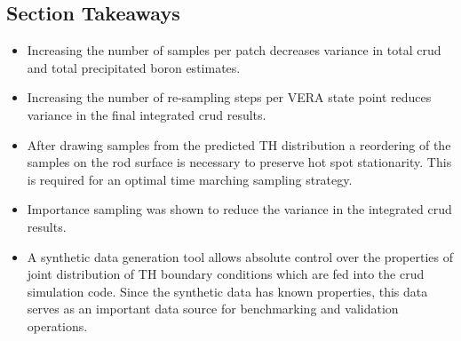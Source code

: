 \subsection{Section Takeaways}
\begin{itemize}
        \item Increasing the number of samples per patch decreases variance in total crud and total precipitated boron estimates.
        \item Increasing the number of re-sampling steps per VERA state point reduces variance in the final integrated crud results.
        \item After drawing samples from the predicted TH distribution a reordering of the samples on the rod surface is necessary to preserve hot spot stationarity.  This is required for an optimal time marching sampling strategy.
        \item Importance sampling was shown to reduce the variance in the integrated crud results.
        \item A synthetic data generation tool allows absolute control over the properties of joint distribution of TH boundary conditions which are fed into the crud simulation code.  Since the synthetic data has known properties, this data serves as an important data source for benchmarking and validation operations.
\end{itemize}
